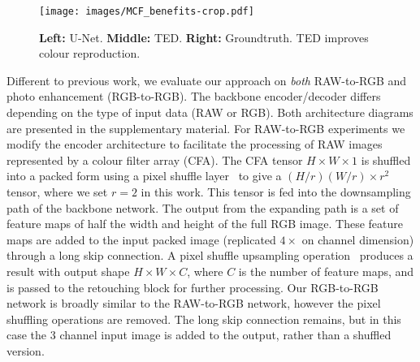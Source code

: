 \documentclass[a4paper,conference]{IEEEtran}
\begin{document}
\begin{table}[t]
\centering
\caption{Backbone network (TED) with MSCA-skip connection, improves image quality with fewer parameters (Samsung S7 dataset).}
\label{tab:resultsMCSA2}
\end{table}

\begin{figure}[t!]
\begin{center}
\texttt{[image: images/MCF\_benefits-crop.pdf]}
\end{center}
\caption{\textbf{Left:} U-Net. \textbf{Middle:} TED. \textbf{Right:} Groundtruth.  TED improves colour reproduction.}
\label{fig:color_bleeding}
\end{figure}

Different to previous work, we evaluate our approach on \emph{both} RAW-to-RGB and photo enhancement (RGB-to-RGB). The backbone encoder/decoder differs depending on the type of input data (RAW or RGB). Both architecture diagrams are presented in the supplementary material. For RAW-to-RGB experiments we modify the encoder architecture to facilitate the processing of RAW images represented by a colour filter array (CFA). The CFA tensor $H{\times}W{\times}1$ is shuffled into a packed form using a pixel shuffle layer~\cite{Ledig17} to give a $(H/r)(W/r){\times}r^{2}$ tensor, where we set $r{=}2$ in this work. This tensor is fed into the downsampling path of the backbone network. The output from the expanding path is a set of feature maps of half the width and height of the full RGB image. These feature maps are added to the input packed image (replicated $4{\times}$ on channel dimension) through a long skip connection. A pixel shuffle upsampling operation~\cite{Ledig17} produces a result with output shape $H{\times}W{\times}C$, where $C$ is the number of feature maps, and is passed to the retouching block for further processing. Our RGB-to-RGB network is broadly similar to the RAW-to-RGB network, however the pixel shuffling operations are removed. The long skip connection remains, but in this case the 3 channel input image is added to the output, rather than a shuffled version. 
\end{document}
